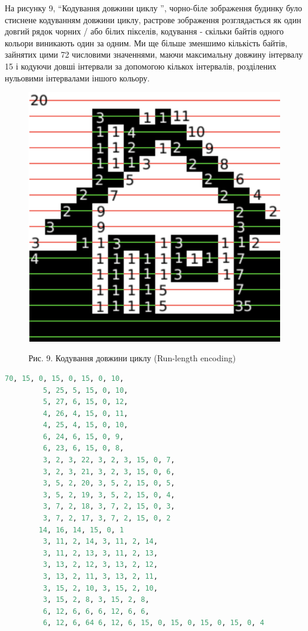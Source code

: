 \documentclass[11pt]{article}
\begin{document}
    На рисунку 9, “Кодування довжини циклу ”, чорно-біле зображення будинку було стиснене кодуванням довжини циклу, растрове зображення розглядається як один довгий рядок чорних / або білих пікселів, кодування - скільки байтів одного кольори виникають один за одним.
    Ми ще більше зменшимо кількість байтів, зайнятих цими 72 числовими значеннями, маючи максимальну довжину інтервалу 15 і кодуючи довші інтервали за допомогою кількох інтервалів, розділених нульовими інтервалами іншого кольору.
    \begin{figure}
        \label{fig:image9}
        \centering
        \includegraphics[scale=0.5]{image9.png}

        Рис. 9. Кодування довжини циклу (Run-length encoding)
    \end{figure}

    \begin{lstlisting}[style=light, language=Python,label={lst:vectorimg},caption=Кодування довжини циклу]
        70, 15, 0, 15, 0, 15, 0, 10,
         5, 25, 5, 15, 0, 10,
         5, 27, 6, 15, 0, 12,
         4, 26, 4, 15, 0, 11,
         4, 25, 4, 15, 0, 10,
         6, 24, 6, 15, 0, 9,
         6, 23, 6, 15, 0, 8,
         3, 2, 3, 22, 3, 2, 3, 15, 0, 7,
         3, 2, 3, 21, 3, 2, 3, 15, 0, 6,
         3, 5, 2, 20, 3, 5, 2, 15, 0, 5,
         3, 5, 2, 19, 3, 5, 2, 15, 0, 4,
         3, 7, 2, 18, 3, 7, 2, 15, 0, 3,
         3, 7, 2, 17, 3, 7, 2, 15, 0, 2
        14, 16, 14, 15, 0, 1
         3, 11, 2, 14, 3, 11, 2, 14,
         3, 11, 2, 13, 3, 11, 2, 13,
         3, 13, 2, 12, 3, 13, 2, 12,
         3, 13, 2, 11, 3, 13, 2, 11,
         3, 15, 2, 10, 3, 15, 2, 10,
         3, 15, 2, 8, 3, 15, 2, 8,
         6, 12, 6, 6, 6, 12, 6, 6,
         6, 12, 6, 64 6, 12, 6, 15, 0, 15, 0, 15, 0, 15, 0, 4
    \end{lstlisting}
\end{document}
